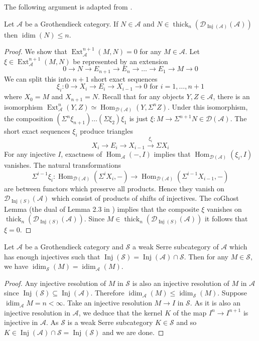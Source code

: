 \documentclass[12pt,oneside]{amsart}
\DeclareMathOperator*{\Inj}{Inj}
\DeclareMathOperator{\Hom}{Hom}
\DeclareMathOperator{\thick}{thick}
\DeclareMathOperator{\Ext}{Ext}
\DeclareMathOperator{\idim}{idim}
\begin{document}
The following argument is adapted from \cite[Lemma 2.4]{KK05}. 

\begin{lemma}  \label{gentoinjdim} Let $\mathcal{A}$ be a Grothendieck category. If $N \in \mathcal{A}$ and $N \in \thick_n(\mathcal{D}_{\Inj(\mathcal{A})}(\mathcal{A}))$ then $\idim(N) \leq n$.
\end{lemma}

\begin{proof}
We show that $\Ext_{\mathcal{A}}^{n+1}(M,N) = 0$ for any $M \in \mathcal{A}$. Let $\xi \in \Ext_{\mathcal{A}}^{n+1}(M,N)$ be represented by an extension
\[
0 \to N \to E_{n+1} \to E_n \to \dots \to E_1 \to M \to 0
\]
We can split this into $n+1$ short exact sequences
\[
\xi_i: 0 \to X_i \to E_i \to X_{i-1} \to 0 \text{ for }i = 1,\dots,n+1
\]
where $X_0 = M$ and $X_{n+1} = N$. Recall that for any objects $Y,Z \in \mathcal{A}$, there is an isomorphism $\Ext_{\mathcal{A}}^n(Y,Z) \simeq \Hom_{\mathcal{D}(\mathcal{A})}(Y,\Sigma^n Z)$. Under this isomorphism, the composition $(\Sigma^n \xi_{n+1}) \dots (\Sigma \xi_2)\xi_1$ is just $\xi: M \to \Sigma^{n+1} N \in \mathcal{D}(\mathcal{A})$. The short exact sequences $\xi_i$ produce triangles
\[
X_i \to E_i \to X_{i-1} \xrightarrow{\xi_i} \Sigma X_i
\]
For any injective $I$, exactness of $\Hom_{\mathcal{A}}(-,I)$ implies that $\Hom_{\mathcal{D}(\mathcal{A})}(\xi_i,I)$ vanishes. The natural transformations 
\[
\Sigma^{i-1} \xi_i: \Hom_{\mathcal{D}(\mathcal{A})}(\Sigma^i X_i,-) \to \Hom_{\mathcal{D}(\mathcal{A})}(\Sigma^{i-1} X_{i-1},-) 
\]
are between functors which preserve all products. Hence they vanish on $\mathcal{D}_{\Inj(S)}(\mathcal{A})$ which consist of products of shifts of injectives. The coGhost Lemma (the dual of Lemma 2.3 in \cite{KK05}) implies that the composite $\xi$ vanishes on $\thick_n(\mathcal{D}_{\Inj(S)}(\mathcal{A}))$. Since $M \in \thick_n(\mathcal{D}_{\Inj(S)}(\mathcal{A}))$ it follows  that $\xi = 0$. 
\end{proof}


\begin{lemma} \label{idimagrees}
Let $\mathcal{A}$ be a Grothendieck category and $\mathcal{S}$ a weak Serre subcategory of $\mathcal{A}$ which has enough injectives such that $\Inj(\mathcal{S}) = \Inj(\mathcal{A}) \cap \mathcal{S}$. Then for any $M \in \mathcal{S}$, we have $\idim_{\mathcal{S}}(M) = \idim_{\mathcal{A}}(M)$. 
\end{lemma}

\begin{proof}
Any injective resolution of $M$ in $\mathcal{S}$ is also an injective resolution of $M$ in $\mathcal{A}$ since $\Inj(\mathcal{S}) \subseteq \Inj(\mathcal{A})$. Therefore $\idim_{\mathcal{A}}(M) \leq \idim_{\mathcal{S}}(M)$. Suppose $\idim_{\mathcal{A}} M= n < \infty$. Take an injective resolution $M \to I$ in $\mathcal{S}$. As it is also an injective resolution in $\mathcal{A}$, we deduce that the kernel $K$ of the map $I^{n} \to I^{n+1}$ is injective in $\mathcal{A}$. As $\mathcal{S}$ is a weak Serre subcategory $K \in \mathcal{S}$ and so $K \in \Inj(\mathcal{A}) \cap \mathcal{S} = \Inj(\mathcal{S})$ and we are done. 
\end{proof}
\end{document}

